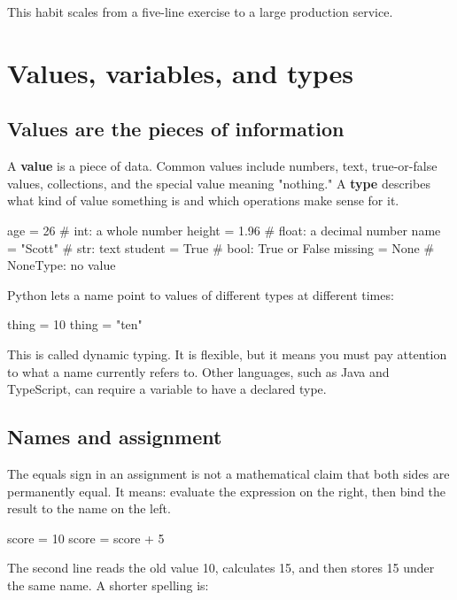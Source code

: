 \documentclass[11pt,openany,oneside]{book}
\newcommand{\term}[1]{\textbf{#1}\index{#1}}
\begin{document}
This habit scales from a five-line exercise to a large production service.

\chapter{Values, variables, and types}

\section{Values are the pieces of information}

A \term{value} is a piece of data. Common values include numbers, text, true-or-false values, collections, and the special value meaning "nothing." A \term{type} describes what kind of value something is and which operations make sense for it.

\begin{code}[language=Python]
age = 26                 # int: a whole number
height = 1.96            # float: a decimal number
name = "Scott"           # str: text
student = True           # bool: True or False
missing = None           # NoneType: no value
\end{code}

Python lets a name point to values of different types at different times:

\begin{code}[language=Python]
thing = 10
thing = "ten"
\end{code}

This is called dynamic typing. It is flexible, but it means you must pay attention to what a name currently refers to. Other languages, such as Java and TypeScript, can require a variable to have a declared type.

\section{Names and assignment}

The equals sign in an assignment is not a mathematical claim that both sides are permanently equal. It means: evaluate the expression on the right, then bind the result to the name on the left.

\begin{code}[language=Python]
score = 10
score = score + 5
\end{code}

The second line reads the old value 10, calculates 15, and then stores 15 under the same name. A shorter spelling is:
\end{document}
